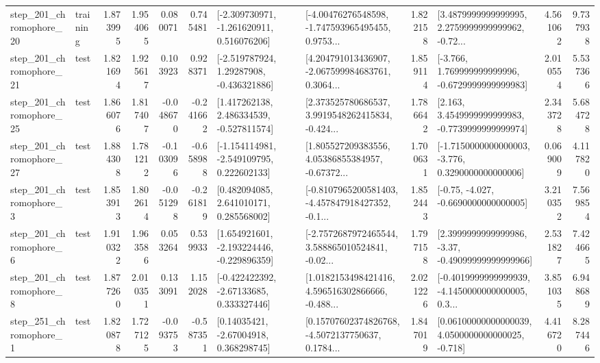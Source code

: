 \begin{tabular}{llrrrrllrlrr}
  step\_201\_chromophore\_20 &  training &      1.873995 &    1.954065 &      0.080071 &  0.745481 &   [-2.309730971, -1.261620911, 0.516076206] &  [-4.00476276548598, -1.747593965495455, 0.9753... &       1.822158 &  [3.4879999999999995, 2.2759999999999962, -0.72... &            4.561062 &          9.737938 \\
  step\_201\_chromophore\_21 &      test &      1.821694 &    1.925617 &      0.103923 &  0.928371 &    [-2.519787924, 1.29287908, -0.436321886] &  [4.204791013436907, -2.067599984683761, 0.3064... &       1.859114 &   [-3.766, 1.769999999999996, -0.6729999999999983] &            2.010554 &          5.537366 \\
  step\_201\_chromophore\_25 &      test &      1.866076 &    1.817407 &     -0.048670 & -0.241662 &    [1.417262138, 2.486334539, -0.527811574] &  [2.373525780686537, 3.9919548262415834, -0.424... &       1.786642 &   [2.163, 3.4549999999999983, -0.7739999999999974] &            2.343728 &          5.684728 \\
  step\_201\_chromophore\_27 &      test &      1.884308 &    1.781212 &     -0.103096 & -0.658988 &   [-1.154114981, -2.549109795, 0.222602133] &  [1.805527209383556, 4.05386855384957, -0.67372... &       1.700631 &  [-1.7150000000000003, -3.776, 0.3290000000000006] &            0.069009 &          4.117820 \\
   step\_201\_chromophore\_3 &      test &      1.853913 &    1.802614 &     -0.051298 & -0.261819 &     [0.482094085, 2.641010171, 0.285568002] &  [-0.8107965200581403, -4.457847918427352, -0.1... &       1.852443 &               [-0.75, -4.027, -0.6690000000000005] &            3.210352 &          7.569854 \\
   step\_201\_chromophore\_6 &      test &      1.910322 &    1.963586 &      0.053264 &  0.539933 &   [1.654921601, -2.193224446, -0.229896359] &  [-2.7572687972465544, 3.588865010524841, -0.02... &       1.797158 &  [2.3999999999999986, -3.37, -0.49099999999999966] &            2.531827 &          7.424665 \\
   step\_201\_chromophore\_8 &      test &      1.877260 &    2.010351 &      0.133091 &  1.152028 &    [-0.422422392, -2.67133685, 0.333327446] &  [1.0182153498421416, 4.596516302866666, -0.488... &       2.021226 &  [-0.4019999999999939, -4.1450000000000005, 0.3... &            3.851035 &          6.948689 \\
   step\_251\_chromophore\_1 &      test &      1.820878 &    1.727125 &     -0.093753 & -0.587351 &      [0.14035421, -2.67004918, 0.368298745] &  [0.15707602374826768, -4.5072137750637, 0.1784... &       1.847019 &  [0.06100000000000039, 4.0500000000000025, -0.718] &            4.416720 &          8.287446 \\

\end{tabular}
